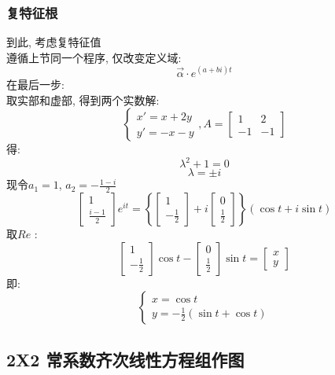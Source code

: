 \subsubsection{\large 复特征根}
到此, 考虑复特征值\\
遵循上节同一个程序, 仅改变定义域:
\[
\vec{\alpha } \cdot e^{(a + bi)t}
\]
在最后一步:\\
取实部和虚部, 得到两个实数解:
\[
\begin{cases}
    x' = x + 2y \\
    y' = -x - y
\end{cases}
, 
A =
\begin{bmatrix}
    1 & 2 \\
    -1 & -1
\end{bmatrix}
\]
得:
\[ \lambda^2 + 1 = 0 \]
\[ \lambda = \pm i \]
现令$a_1 = 1$, $a_2 = - \frac{1-i}{2}$
\[
\begin{bmatrix}
    1 \\
    \frac{i-1}{2}
\end{bmatrix}
e^{it} =
\left\{
\begin{bmatrix}
    1 \\
    -\frac{1}{2}
\end{bmatrix}
+
i
\begin{bmatrix}
    0 \\
    \frac{1}{2}
\end{bmatrix}
\right\} 
(\cos t + i \sin t)
\]
取$Re$ :
\[
\begin{bmatrix}
    1 \\
    -\frac{1}{2}
\end{bmatrix}
\cos t -
\begin{bmatrix}
    0  \\
    \frac{1}{2}
\end{bmatrix}
\sin t =
\begin{bmatrix}
    x \\
    y
\end{bmatrix}
\]
即:
\[
\begin{cases}
    x = \cos t \\
    y = -\frac{1}{2}(\sin t + \cos t)
\end{cases}
\]

\newpage
\subsection{\LARGE \hspace*{0.1em}2X2 常系数齐次线性方程组作图 }

